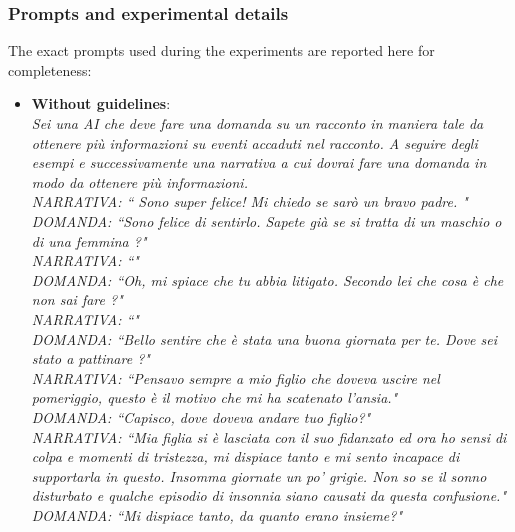 \subsubsection{Prompts and experimental details}
% 
The exact prompts used during the experiments are reported here for completeness:
\begin{itemize}
    \item \textbf{Without guidelines}: \\ \emph{Sei una AI che deve fare una domanda su un racconto in maniera tale da ottenere più informazioni su eventi accaduti nel racconto. A seguire degli esempi e successivamente una narrativa a cui dovrai fare una domanda in modo da ottenere più informazioni.\\
       NARRATIVA: ``  Sono super felice! Mi chiedo se sarò un bravo padre. "\\
       DOMANDA: ``Sono felice di sentirlo. Sapete già se si tratta di un maschio o di una femmina ?"\\
       NARRATIVA: ``"\\
       DOMANDA: ``Oh, mi spiace che tu abbia litigato. Secondo lei che cosa è che non sai fare ?"\\
       NARRATIVA: ``"\\
       DOMANDA: ``Bello sentire che è stata una buona giornata per te. Dove sei stato a pattinare ?"\\
       NARRATIVA: ``Pensavo sempre a mio figlio che doveva uscire nel pomeriggio, questo è il motivo che mi ha scatenato l’ansia."\\
       DOMANDA: ``Capisco, dove doveva andare tuo figlio?"\\
       NARRATIVA: ``Mia figlia si è lasciata con il suo fidanzato ed ora ho sensi di colpa e momenti di tristezza, mi dispiace tanto e mi sento incapace di supportarla in questo. Insomma giornate un po’ grigie. Non so se il sonno disturbato e qualche episodio di insonnia siano causati da questa confusione."\\
       DOMANDA: ``Mi dispiace tanto, da quanto erano insieme?"\\
}
\end{itemize}
